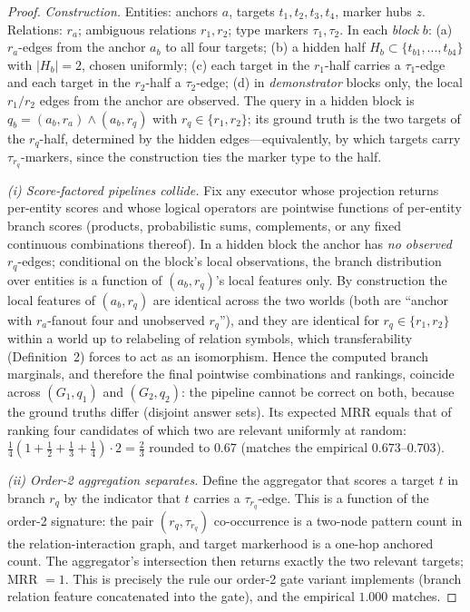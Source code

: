 \documentclass[journal]{IEEEtran}
\begin{document}
\begin{proof}
\emph{Construction.} Entities: anchors $a$, targets
$t_1,t_2,t_3,t_4$, marker hubs $z$. Relations: $r_a$; ambiguous
relations $r_1,r_2$; type markers $\tau_1,\tau_2$. In each \emph{block}
$b$: (a) $r_a$-edges from the anchor $a_b$ to all four targets;
(b) a hidden half $H_b\subset\{t_{b1},...,t_{b4}\}$ with $|H_b|=2$, chosen
uniformly; (c) each target in the $r_1$-half carries a $\tau_1$-edge and
each target in the $r_2$-half a $\tau_2$-edge; (d) in \emph{demonstrator}
blocks only, the local $r_1/r_2$ edges from the anchor are observed. The
query in a hidden block is $q_b=(a_b,r_a)\wedge(a_b,r_q)$ with
$r_q\in\{r_1,r_2\}$; its ground truth is the two targets of the
$r_q$-half, determined by the hidden edges---equivalently, by which
targets carry $\tau_{r_q}$-markers, since the construction ties the
marker type to the half.

\emph{(i) Score-factored pipelines collide.} Fix any executor whose
projection returns per-entity scores and whose logical operators are
pointwise functions of per-entity branch scores (products, probabilistic
sums, complements, or any fixed continuous combinations thereof). In a
hidden block the anchor has \emph{no observed} $r_q$-edges; conditional
on the block's local observations, the branch distribution over entities
is a function of $(a_b, r_q)$'s local features only. By construction the
local features of $(a_b,r_q)$ are identical across the two worlds (both
are ``anchor with $r_a$-fanout four and unobserved $r_q$''), and they are
identical for $r_q\in\{r_1,r_2\}$ within a world up to relabeling of
relation symbols, which transferability (Definition~2) forces to act as an
isomorphism. Hence the computed branch marginals, and therefore the final
pointwise combinations and rankings, coincide across $(G_1,q_1)$ and
$(G_2,q_2)$: the pipeline cannot be correct on both, because the ground
truths differ (disjoint answer sets). Its expected MRR equals that of
ranking four candidates of which two are relevant uniformly at random:
$\tfrac14(1+\tfrac12+\tfrac13+\tfrac14)\cdot 2=\tfrac{2}{3}$ rounded to
$0.67$ (matches the empirical $0.673$--$0.703$).

\emph{(ii) Order-2 aggregation separates.} Define the aggregator that
scores a target $t$ in branch $r_q$ by the indicator that $t$ carries a
$\tau_{r_q}$-edge. This is a function of the order-2 signature: the pair
$(r_q,\tau_{r_q})$ co-occurrence is a two-node pattern count in the
relation-interaction graph, and target markerhood is a one-hop anchored
count. The aggregator's intersection then returns exactly the two
relevant targets; MRR $=1$. This is precisely the rule our order-2 gate
variant implements (branch relation feature concatenated into the gate),
and the empirical $1.000$ matches.
\end{proof}
\end{document}
